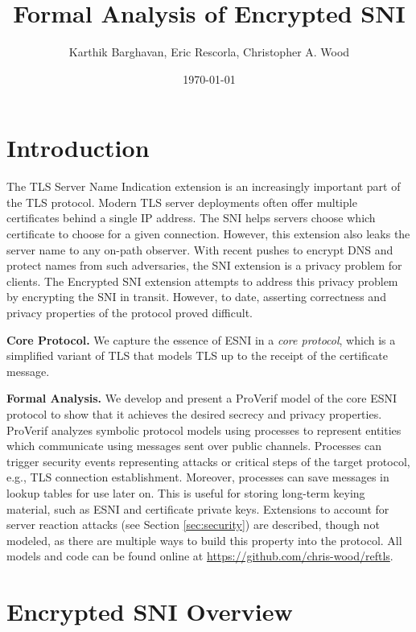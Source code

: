 \documentclass{article}
\title{Formal Analysis of Encrypted SNI}
\author{Karthik Barghavan, Eric Rescorla, Christopher A. Wood}
\date{\today}
\theoremstyle{definition}
\theoremstyle{definition}
\begin{document}
\maketitle

\tableofcontents

\section{Introduction}

The TLS Server Name Indication extension \cite{rfc6066} is an increasingly important part of the TLS protocol.
Modern TLS server deployments often offer multiple certificates behind a single IP address. The SNI helps
servers choose which certificate to choose for a given connection. However, this extension also leaks the 
server name to any on-path observer. With recent pushes to encrypt DNS and protect names from such adversaries,
the SNI extension is a privacy problem for clients. The Encrypted SNI extension \cite{ietf-tls-esni-04} attempts
to address this privacy problem by encrypting the SNI in transit. However, to date, asserting correctness and
privacy properties of the protocol proved difficult. 

\textbf{Core Protocol.} We capture the essence of ESNI in a \emph{core protocol}, which is a simplified variant
of TLS that models TLS up to the receipt of the certificate message.

\textbf{Formal Analysis.} We develop and present a ProVerif model of the core ESNI protocol to show that it
achieves the desired secrecy and privacy properties.  ProVerif analyzes symbolic protocol models using 
processes to represent entities which communicate using messages sent over public channels. Processes
can trigger security events representing attacks or critical steps of the target protocol, e.g., TLS connection establishment.
Moreover, processes can save messages in lookup tables for use later on. This is useful for storing long-term keying
material, such as ESNI and certificate private keys. Extensions to account for server reaction attacks 
(see Section \ref{sec:security}) are described, though not modeled, as there are multiple ways to build 
this property into the protocol. All models and code can be found online at \url{https://github.com/chris-wood/reftls}.


\section{Encrypted SNI Overview}
\end{document}
